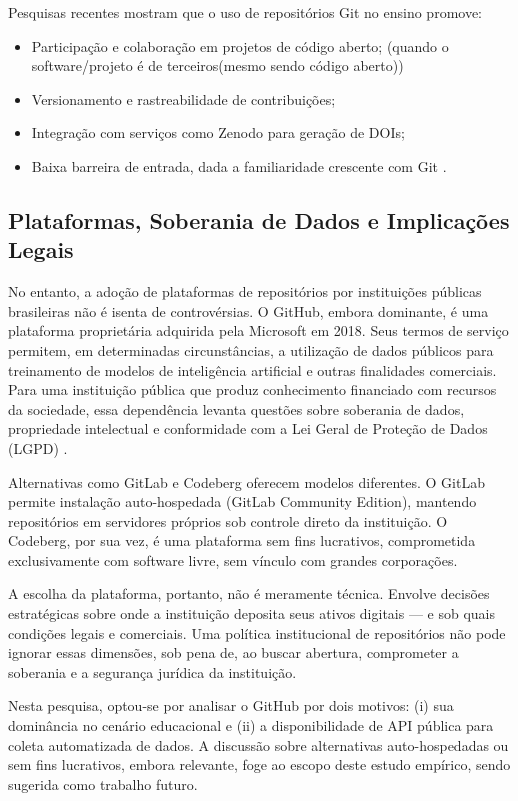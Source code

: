 \documentclass[english, spanish, brazilian]{RBIEarticle}
\begin{document}
	Pesquisas recentes mostram que o uso de repositórios Git no ensino promove:
	\begin{itemize}
		\item Participação e colaboração em projetos de código aberto; (quando o software/projeto é de terceiros(mesmo sendo código aberto))
		\item Versionamento e rastreabilidade de contribuições;
		\item Integração com serviços como Zenodo para geração de DOIs;
		\item Baixa barreira de entrada, dada a familiaridade crescente com Git \cite{vanGeest2024}.
	\end{itemize}
	
	\subsection{Plataformas, Soberania de Dados e Implicações Legais}
	
	No entanto, a adoção de plataformas de repositórios por instituições públicas brasileiras não é isenta de controvérsias. O GitHub, embora dominante, é uma plataforma proprietária adquirida pela Microsoft em 2018. Seus termos de serviço permitem, em determinadas circunstâncias, a utilização de dados públicos para treinamento de modelos de inteligência artificial e outras finalidades comerciais. Para uma instituição pública que produz conhecimento financiado com recursos da sociedade, essa dependência levanta questões sobre soberania de dados, propriedade intelectual e conformidade com a Lei Geral de Proteção de Dados (LGPD) \cite{lgpd2018}.
	
	Alternativas como GitLab e Codeberg oferecem modelos diferentes. O GitLab permite instalação auto-hospedada (GitLab Community Edition), mantendo repositórios em servidores próprios sob controle direto da instituição. O Codeberg, por sua vez, é uma plataforma sem fins lucrativos, comprometida exclusivamente com software livre, sem vínculo com grandes corporações.
	
	A escolha da plataforma, portanto, não é meramente técnica. Envolve decisões estratégicas sobre onde a instituição deposita seus ativos digitais — e sob quais condições legais e comerciais. Uma política institucional de repositórios não pode ignorar essas dimensões, sob pena de, ao buscar abertura, comprometer a soberania e a segurança jurídica da instituição.
	
	Nesta pesquisa, optou-se por analisar o GitHub por dois motivos: (i) sua dominância no cenário educacional e (ii) a disponibilidade de API pública para coleta automatizada de dados. A discussão sobre alternativas auto-hospedadas ou sem fins lucrativos, embora relevante, foge ao escopo deste estudo empírico, sendo sugerida como trabalho futuro.
	
\end{document}
